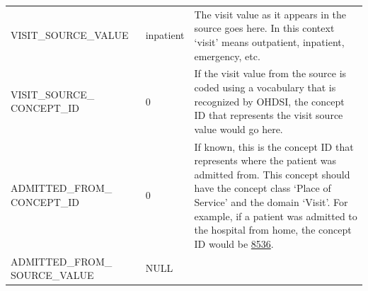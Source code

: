 \documentclass[11pt]{book}
\begin{document}
\begin{longtable}[]{@{}lll@{}}
\begin{minipage}[t]{0.27\columnwidth}\raggedright\strut
VISIT\_SOURCE\_VALUE\strut
\end{minipage} & \begin{minipage}[t]{0.15\columnwidth}\raggedright\strut
inpatient\strut
\end{minipage} & \begin{minipage}[t]{0.49\columnwidth}\raggedright\strut
The visit value as it appears in the source goes here. In this context
`visit' means outpatient, inpatient, emergency, etc.\strut
\end{minipage}\tabularnewline
\begin{minipage}[t]{0.27\columnwidth}\raggedright\strut
VISIT\_SOURCE\_ CONCEPT\_ID\strut
\end{minipage} & \begin{minipage}[t]{0.15\columnwidth}\raggedright\strut
0\strut
\end{minipage} & \begin{minipage}[t]{0.49\columnwidth}\raggedright\strut
If the visit value from the source is coded using a vocabulary that is
recognized by OHDSI, the concept ID that represents the visit source
value would go here.\strut
\end{minipage}\tabularnewline
\begin{minipage}[t]{0.27\columnwidth}\raggedright\strut
ADMITTED\_FROM\_ CONCEPT\_ID\strut
\end{minipage} & \begin{minipage}[t]{0.15\columnwidth}\raggedright\strut
0\strut
\end{minipage} & \begin{minipage}[t]{0.49\columnwidth}\raggedright\strut
If known, this is the concept ID that represents where the patient was
admitted from. This concept should have the concept class `Place of
Service' and the domain `Visit'. For example, if a patient was admitted
to the hospital from home, the concept ID would be
\href{http://athena.ohdsi.org/search-terms/terms/8536}{8536}.\strut
\end{minipage}\tabularnewline
\begin{minipage}[t]{0.27\columnwidth}\raggedright\strut
ADMITTED\_FROM\_ SOURCE\_VALUE\strut
\end{minipage} & \begin{minipage}[t]{0.15\columnwidth}\raggedright\strut
NULL\strut
\end{minipage} & \begin{minipage}[t]{0.49\columnwidth}\raggedright\strut

\end{minipage}
\end{longtable}
\end{document}
